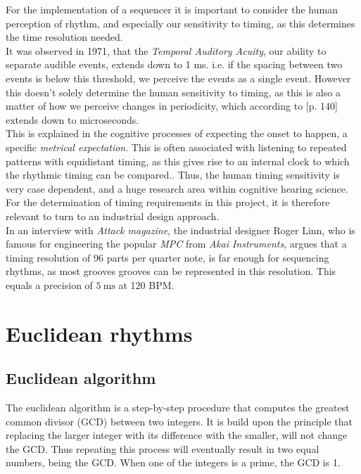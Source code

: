 For the implementation of a sequencer it is important to consider the human perception of rhythm, and especially our sensitivity to timing, as this determines the time resolution needed.\\
It was observed in 1971, that the \textit{Temporal Auditory Acuity}, our ability to separate audible events, extends down to 1 ms.\cite{green} i.e. if the spacing between two events is below this threshold, we perceive the events as a single event. However this doesn't solely determine the human sensitivity to timing, as this is also a matter of how we perceive changes in periodicity, which according to \cite{roads}[p. 140] extends down to microseconds.\\
This is explained in the cognitive processes of expecting the onset to happen, a specific \textit{metrical expectation}\cite{psychologyofmusic}. This is often associated with listening to repeated patterns with equidistant timing, as this gives rise to an internal clock to which the rhythmic timing can be compared.\cite{parncutt}. Thus, the human timing sensitivity is very case dependent, and a huge research area within cognitive hearing science. For the determination of timing requirements in this project, it is therefore relevant to turn to an industrial design approach.\\
In an interview with \textit{Attack magazine}, the industrial designer Roger Linn, who is famous for engineering the popular \textit{MPC} from \textit{Akai Instruments}, argues that a timing resolution of 96 parts per quarter note, is far enough for sequencing rhythms\cite{linn}, as most grooves grooves can be represented in this resolution. This equals a precision of $\SI{5}{\milli\second}$ at 120 BPM. 


\section{Euclidean rhythms}

    
\subsection{Euclidean algorithm}
\label{sec:euclidean_ago}
The euclidean algorithm is a step-by-step procedure that computes the greatest common divisor (GCD) between two integers. 
It is build upon the principle that replacing the larger integer with its difference with the smaller, will not change the GCD. Thus repeating this process will eventually result in two equal numbers, being the GCD. When one of the integers is a prime, the GCD is 1. \\ 


